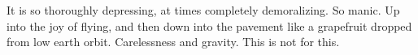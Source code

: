 

It is so thoroughly depressing, at times completely demoralizing.  So
manic.  Up into the joy of flying, and then down into the pavement
like a grapefruit dropped from low earth orbit.  Carelessness and
gravity.  This is not for this.

\bye
